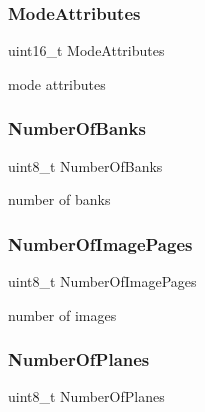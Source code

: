 \subsubsection{\texorpdfstring{Mode\+Attributes}{ModeAttributes}}
{\footnotesize\ttfamily uint16\+\_\+t Mode\+Attributes}



mode attributes 

\hypertarget{struct____attribute_____aa955c03441b6d3e55b2ba4be4dae56a2}{}\label{struct____attribute_____aa955c03441b6d3e55b2ba4be4dae56a2} 
\subsubsection{\texorpdfstring{Number\+Of\+Banks}{NumberOfBanks}}
{\footnotesize\ttfamily uint8\+\_\+t Number\+Of\+Banks}



number of banks 

\hypertarget{struct____attribute_____a7033bb4cac6dc49f68ca4df855151e09}{}\label{struct____attribute_____a7033bb4cac6dc49f68ca4df855151e09} 
\subsubsection{\texorpdfstring{Number\+Of\+Image\+Pages}{NumberOfImagePages}}
{\footnotesize\ttfamily uint8\+\_\+t Number\+Of\+Image\+Pages}



number of images 

\hypertarget{struct____attribute_____a51268efaac55d78e17263aff9a447998}{}\label{struct____attribute_____a51268efaac55d78e17263aff9a447998} 
\subsubsection{\texorpdfstring{Number\+Of\+Planes}{NumberOfPlanes}}
{\footnotesize\ttfamily uint8\+\_\+t Number\+Of\+Planes}



